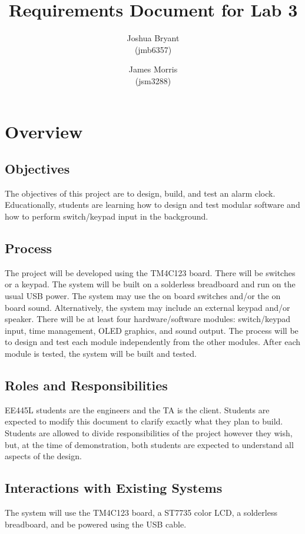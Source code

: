 \documentclass{article}
\begin{document}
\title{Requirements Document for Lab 3}
\author{Joshua Bryant \\(jmb6357) \and James Morris \\(jsm3288)}

\maketitle

\section{Overview}

	\subsection{Objectives}
	The objectives of this project are to design, build, and test an alarm clock. Educationally, students are learning how to design and test modular software and how to perform switch/keypad input in the background.

	\subsection{Process}
	The project will be developed using the TM4C123 board. There will be switches or a keypad. The system will be built on a solderless breadboard and run on the usual USB power. The system may use the on board switches and/or the on board sound. Alternatively, the system may include an external keypad and/or speaker. There will be at least four hardware/software modules: switch/keypad input, time management, OLED graphics, and sound output. The process will be to design and test each module independently from the other modules. After each module is tested, the system will be built and tested.
	
	\subsection{Roles and Responsibilities}
	EE445L students are the engineers and the TA is the client. Students are expected to modify this document to clarify exactly what they plan to build. Students are allowed to divide responsibilities of the project however they wish, but, at the time of demonstration, both students are expected to understand all aspects of the design.
	
	\subsection{Interactions with Existing Systems}
	The system will use the TM4C123 board, a ST7735 color LCD, a solderless breadboard, and be powered using the USB cable.	
	
\end{document}
